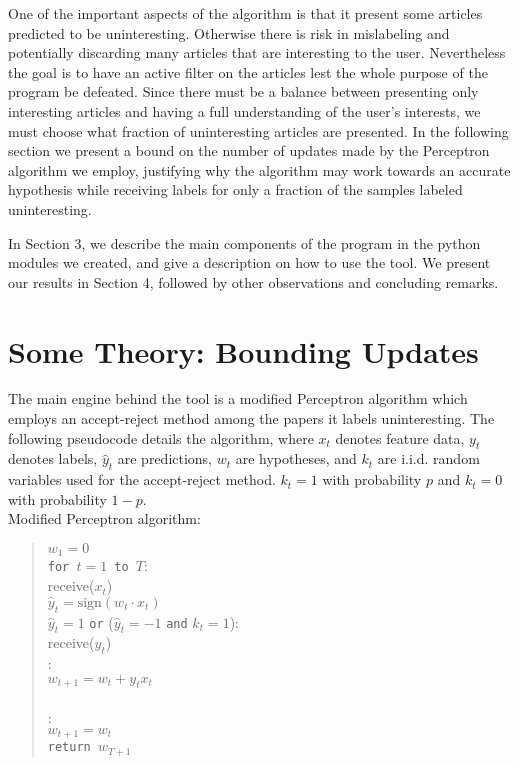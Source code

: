 \documentclass[12pt]{article}
\begin{document}
One of the important aspects of the algorithm is that it present some articles predicted to be uninteresting. Otherwise there is risk in mislabeling and potentially discarding many articles that are interesting to the user. Nevertheless the goal is to have an active filter on the articles lest the whole purpose of the program be defeated. Since there must be a balance between presenting only interesting articles and having a full understanding of the user's interests, we must choose what fraction of uninteresting articles are presented. In the following section we present a bound on the number of updates made by the Perceptron algorithm we employ, justifying why the algorithm may work towards an accurate hypothesis while receiving labels for only a fraction of the samples labeled uninteresting.

In Section 3, we describe the main components of the program in the python modules we created, and give a description on how to use the tool. We present our results in Section 4, followed by other observations and concluding remarks.



\section{Some Theory: Bounding Updates}

The main engine behind the tool is a modified Perceptron algorithm which employs an accept-reject method among the papers it labels uninteresting. The following pseudocode details the algorithm, where $x_t$ denotes feature data, $y_t$ denotes labels, $\widehat{y}_t$ are predictions, $w_t$ are hypotheses, and $k_t$ are i.i.d. random variables used for the accept-reject method. $k_t = 1$ with probability $p$ and $k_t = 0$ with probability $1-p$.\\


\noindent Modified Perceptron algorithm:
\begin{quotation}
\noindent $w_1=0$\\
{\tt for $t=1$ to $T$}:\\
\indent receive($x_t$)\\
\indent $\widehat{y}_t=\mbox{sign}(w_t\cdot x_t)$\\
 $\widehat{y}_t =1$ {\tt or} ($\widehat{y}_t =-1$ {\tt and} $k_t = 1$):\\
\indent\indent receive($y_t$)\\
\indent{}:\\
\indent\indent\indent $w_{t+1} = w_t + y_t x_t$\\
\indent{}\\
:\\
\indent\indent $w_{t+1} = w_t$\\
{\tt return $w_{T+1}$}

\end{quotation}
\end{document}
